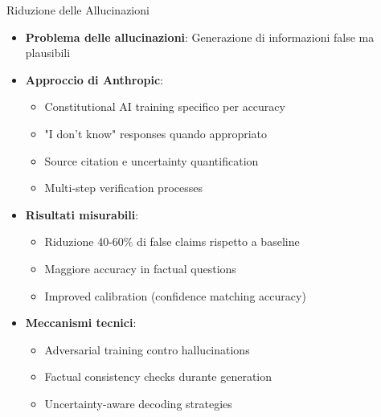 \documentclass[aspectratio=169]{beamer}
\begin{document}
\begin{frame}{Riduzione delle Allucinazioni}
\begin{itemize}
    \item \textbf{Problema delle allucinazioni}: Generazione di informazioni false ma plausibili
    \item \textbf{Approccio di Anthropic}:
    \begin{itemize}
        \item Constitutional AI training specifico per accuracy
        \item "I don't know" responses quando appropriato
        \item Source citation e uncertainty quantification
        \item Multi-step verification processes
    \end{itemize}
    \item \textbf{Risultati misurabili}:
    \begin{itemize}
        \item Riduzione 40-60\% di false claims rispetto a baseline
        \item Maggiore accuracy in factual questions
        \item Improved calibration (confidence matching accuracy)
    \end{itemize}
    \item \textbf{Meccanismi tecnici}:
    \begin{itemize}
        \item Adversarial training contro hallucinations
        \item Factual consistency checks durante generation
        \item Uncertainty-aware decoding strategies
    \end{itemize}
\end{itemize}
\end{frame}
%
%
\end{document}
